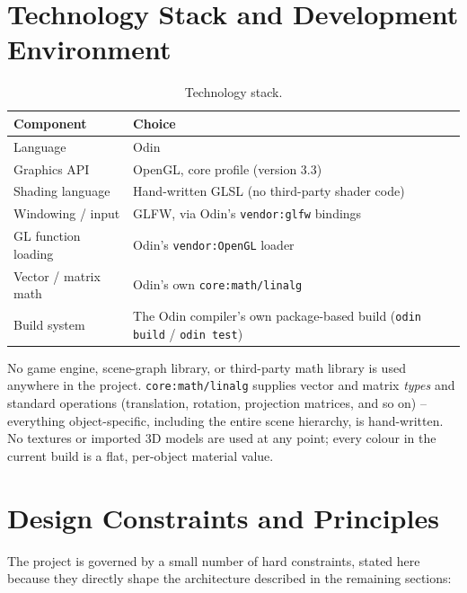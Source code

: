 \documentclass[11pt,a4paper]{article}
\begin{document}
\section{Technology Stack and Development Environment}

\begin{table}[H]
\centering
\caption{Technology stack.}
\label{tab:stack}
\begin{tabular}{ll}
\toprule
\textbf{Component} & \textbf{Choice} \\
\midrule
Language & Odin \\
Graphics API & OpenGL, core profile (version 3.3) \\
Shading language & Hand-written GLSL (no third-party shader code) \\
Windowing / input & GLFW, via Odin's \texttt{vendor:glfw} bindings \\
GL function loading & Odin's \texttt{vendor:OpenGL} loader \\
Vector / matrix math & Odin's own \texttt{core:math/linalg} \\
Build system & The Odin compiler's own package-based build (\texttt{odin build} / \texttt{odin test}) \\
\bottomrule
\end{tabular}
\end{table}

No game engine, scene-graph library, or third-party math library is
used anywhere in the project. \texttt{core:math/linalg} supplies vector
and matrix \emph{types} and standard operations (translation, rotation,
projection matrices, and so on) -- everything object-specific,
including the entire scene hierarchy, is hand-written. No textures or
imported 3D models are used at any point; every colour in the current
build is a flat, per-object material value.

\section{Design Constraints and Principles}
\label{sec:constraints}

The project is governed by a small number of hard constraints, stated
here because they directly shape the architecture described in the
remaining sections:
\end{document}
